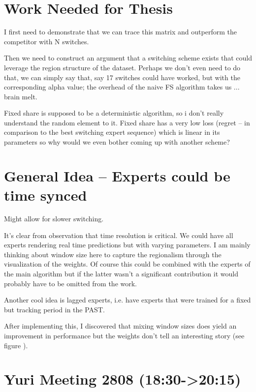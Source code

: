 \documentclass[envcountsame]{llncs}
\begin{document}
\section{Work Needed for Thesis}

I first need to demonstrate that we can trace this matrix and outperform the competitor with N switches. 

Then we need to construct an argument that a switching scheme exists that could leverage the region structure of the dataset. Perhaps we don't even need to do that, we can simply say that, say 17 switches could have worked, but with the corresponding alpha value; the overhead of the naive FS algorithm takes us ... brain melt. 

Fixed share is supposed to be a deterministic algorithm, so i don't really understand the random element to it. Fixed share has a very low loss (regret -- in comparison to the best switching expert sequence) which is linear in its parameters so why would we even bother coming up with another scheme?

\section{General Idea -- Experts could be time synced}

Might allow for slower switching.

It's clear from observation that time resolution is critical. We could have all experts rendering real time predictions but with varying parameters. I am mainly thinking about window size here to capture the regionalism through the visualization of the weights. Of course this could be combined with the experts of the main algorithm but if the latter wasn't a significant contribution it would probably have to be omitted from the work. 

Another cool idea is lagged experts, i.e. have experts that were trained for a fixed but tracking period in the PAST. 

After implementing this, I discovered that mixing window sizes does yield an improvement in performance but the weights don't tell an interesting story (see figure \cite{fig:mixregionsize}). 


\section{Yuri Meeting 2808 (18:30->20:15)}
\end{document}
